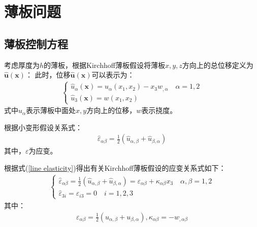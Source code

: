 \chapter{薄板问题}
\section{薄板控制方程}
考虑厚度为$h$的薄板，根据Kirchhoff薄板假设将薄板$x,y,z$方向上的总位移定义为$\hat{\pmb{u}}(\pmb{x})$：
此时，位移$\hat{\pmb{u}}(\pmb{x})$可以表示为：
\begin{equation}
    \begin{split}
    \begin{cases}
        \hat{u}_{\alpha}(\pmb{x})=u_{\alpha}(x_1,x_2)-x_3w_{,\alpha}\quad \alpha=1,2\\
        \hat{u}_3(\pmb{x})=w(x_1,x_2)
    \end{cases}
    \end{split}
    \end{equation}
式中$u_{\alpha}$表示薄板中面处$x,y$方向上的位移，$w$表示挠度。\par
根据小变形假设关系式：
\begin{equation}\label{line elasticity}
\begin{split}
    \hat{\varepsilon}_{\alpha\beta}=\frac{1}{2}(\hat{u}_{\alpha,\beta}+\hat{u}_{\beta,\alpha})
\end{split}
\end{equation}
其中，${\varepsilon}$为应变。\par
根据式(\ref{line elasticity})得出有关Kirchhoff薄板假设的应变关系式如下：
\begin{equation}\label{strain}
\begin{split}
\begin{cases}
    \hat{\varepsilon}_{\alpha\beta}=\frac{1}{2}(\hat{u}_{\alpha,\beta}+\hat{u}_{\beta,\alpha})=\varepsilon_{\alpha\beta}+\kappa_{\alpha\beta}x_3 \quad \alpha,\beta=1,2\\
    \hat{\varepsilon}_{3i}=\hat{\varepsilon}_{i3}=0 \quad i=1,2,3
\end{cases}
\end{split}
\end{equation}
其中：
\begin{equation}
\begin{split}
    \varepsilon_{\alpha\beta}=\frac{1}{2}(u_{\alpha,\beta}+u_{\beta,\alpha}),\kappa_{\alpha\beta}=-w_{,\alpha\beta}
\end{split}
\end{equation}
